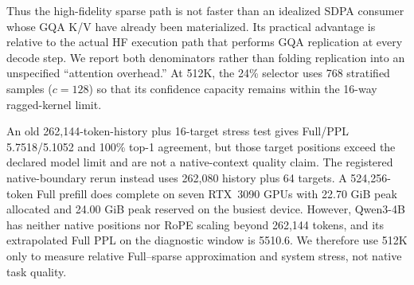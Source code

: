 \begin{table}[!htbp]
\caption{High-fidelity long-history attention timing on one RTX~3090.
\method uses 24\% active tokens and includes Query projection/quantization,
low-bit retrieval, sampled-quantile selection, and exact sparse attention.
The pre-expanded baseline excludes GQA replication, whereas the HF-style
baseline includes \texttt{repeat\_kv} and SDPA.  Times sum 36 Qwen3-style
layers and exclude index construction and non-attention model work.}
\label{tab:long-history-highfidelity-attention}
\centering
\small
{}
\end{table}

Thus the high-fidelity sparse path is not faster than an idealized SDPA
consumer whose GQA K/V have already been materialized.  Its practical
advantage is relative to the actual HF execution path that performs GQA
replication at every decode step.  We report both denominators rather than
folding replication into an unspecified ``attention overhead.''  At 512K,
the 24\% selector uses 768 stratified samples ($c=128$) so that its confidence
capacity remains within the 16-way ragged-kernel limit.

An old 262,144-token-history plus 16-target stress test gives
Full/\method PPL 5.7518/5.1052 and 100\% top-1 agreement, but those target
positions exceed the declared model limit and are not a native-context
quality claim.  The registered native-boundary rerun instead uses 262,080
history plus 64 targets.  A 524,256-token Full prefill does complete on seven
RTX~3090 GPUs with 22.70 GiB peak allocated and 24.00 GiB peak reserved on
the busiest device.  However, Qwen3-4B has neither native positions nor RoPE
scaling beyond 262,144 tokens, and its extrapolated Full PPL on the diagnostic
window is 5510.6.  We therefore use 512K only to measure relative
Full--sparse approximation and system stress, not native task quality.

